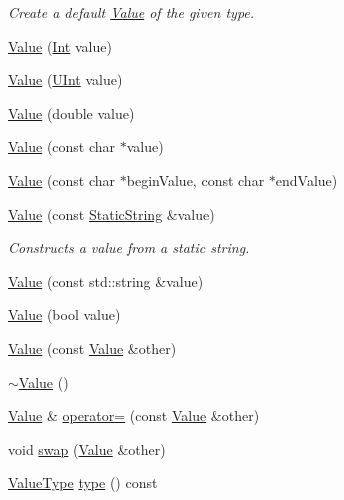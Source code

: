 \begin{DoxyCompactItemize}
\begin{DoxyCompactList}\small\item\em Create a default \hyperlink{classJson_1_1Value}{Value} of the given type. \end{DoxyCompactList}\item 
\hyperlink{classJson_1_1Value_a4744ae571fcf34f4b16a2257b3b3b585}{Value} (\hyperlink{classJson_1_1Value_abdf7a7ff73eb130ffcab28504ffdb405}{Int} value)
\item 
\hyperlink{classJson_1_1Value_ae67a857b01286e3499a87e95be848d20}{Value} (\hyperlink{classJson_1_1Value_a0933d59b45793ae4aade1757c322a98d}{U\-Int} value)
\item 
\hyperlink{classJson_1_1Value_a32228cc84d83200cca8441451997996c}{Value} (double value)
\item 
\hyperlink{classJson_1_1Value_ad87b849356816aca75995dd07302e49d}{Value} (const char $\ast$value)
\item 
\hyperlink{classJson_1_1Value_a13e567d467bb1e699d71e27a76b0e988}{Value} (const char $\ast$begin\-Value, const char $\ast$end\-Value)
\item 
\hyperlink{classJson_1_1Value_a081830e95f88a37054da7e46c65b0766}{Value} (const \hyperlink{classJson_1_1StaticString}{Static\-String} \&value)
\begin{DoxyCompactList}\small\item\em Constructs a value from a static string. \end{DoxyCompactList}\item 
\hyperlink{classJson_1_1Value_aa4501dd4edf3ce3d5145fc656f088b21}{Value} (const std\-::string \&value)
\item 
\hyperlink{classJson_1_1Value_a350a31ea4a30d384994b0bc010b17495}{Value} (bool value)
\item 
\hyperlink{classJson_1_1Value_a436dfd3670f95fd665f680eba5cebcf0}{Value} (const \hyperlink{classJson_1_1Value}{Value} \&other)
\item 
\hyperlink{classJson_1_1Value_a287dea48da3912d02756735bf677b27b}{$\sim$\-Value} ()
\item 
\hyperlink{classJson_1_1Value}{Value} \& \hyperlink{classJson_1_1Value_abb95221f35541039431cd4bd21d42eaa}{operator=} (const \hyperlink{classJson_1_1Value}{Value} \&other)
\item 
void \hyperlink{classJson_1_1Value_aab841120d78e296e1bc06a373345e822}{swap} (\hyperlink{classJson_1_1Value}{Value} \&other)
\item 
\hyperlink{namespaceJson_a7d654b75c16a57007925868e38212b4e}{Value\-Type} \hyperlink{classJson_1_1Value_a695ef31fad36b4712918b3ff80158479}{type} () const 

\end{DoxyCompactItemize}
